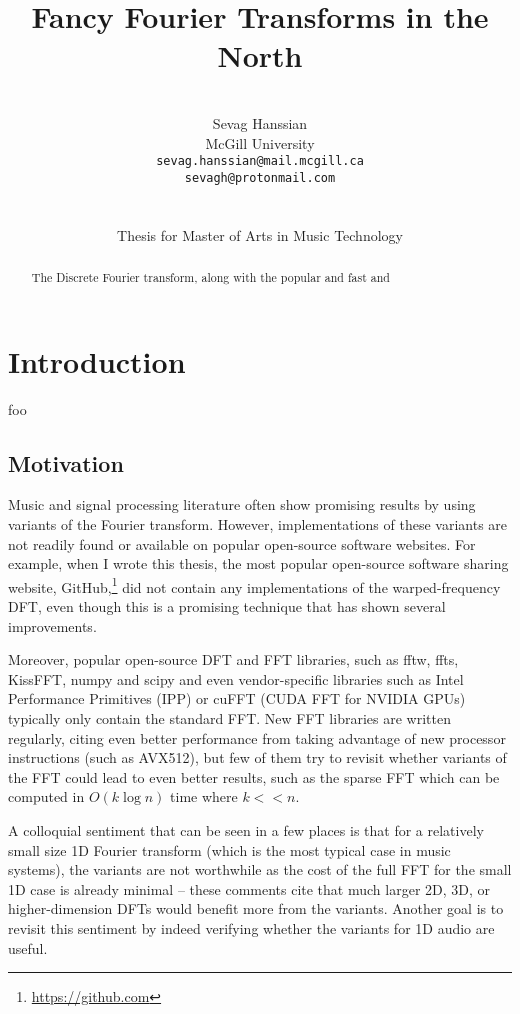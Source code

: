 \documentclass[letter,12pt]{article}
\title{Fancy Fourier Transforms in the North}
\author{\vspace{2em}\\Sevag Hanssian \\
  McGill University \\
 \texttt{sevag.hanssian@mail.mcgill.ca} \\
 \texttt{sevagh@protonmail.com} \\\ \\\ \\
 Thesis for Master of Arts in Music Technology}
\date{}
\begin{document}
\maketitle

\vfill
\clearpage %

\tableofcontents

\vfill
\clearpage %

\listoffigures

\listoflistings

\vfill
\clearpage %

\begin{abstract}
	The Discrete Fourier transform, along with the popular and fast and 
\end{abstract}

\section{Introduction}
\label{sec:intro}

foo

\subsection{Motivation}

Music and signal processing literature often show promising results by using variants of the Fourier transform. However, implementations of these variants are not readily found or available on popular open-source software websites. For example, when I wrote this thesis, the most popular open-source software sharing website, GitHub,\footnote{\href{https://github.com}{https://github.com}} did not contain any implementations of the warped-frequency DFT, even though this is a promising technique that has shown several improvements.

Moreover, popular open-source DFT and FFT libraries, such as fftw, ffts, KissFFT, numpy and scipy and even vendor-specific libraries such as Intel Performance Primitives (IPP) or cuFFT (CUDA FFT for NVIDIA GPUs) typically only contain the standard FFT. New FFT libraries are written regularly, citing even better performance from taking advantage of new processor instructions (such as AVX512), but few of them try to revisit whether variants of the FFT could lead to even better results, such as the sparse FFT which can be computed in  $O(k \log n)$ time where $k << n$.

A colloquial sentiment that can be seen in a few places is that for a relatively small size 1D Fourier transform (which is the most typical case in music systems), the variants are not worthwhile as the cost of the full FFT for the small 1D case is already minimal  -- these comments cite that much larger 2D, 3D, or higher-dimension DFTs would benefit more from the variants. Another goal is to revisit this sentiment by indeed verifying whether the variants for 1D audio are useful.
\end{document}
